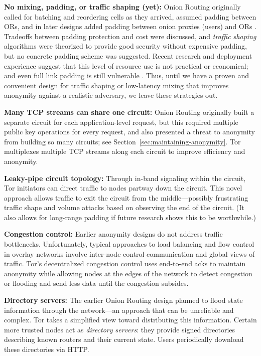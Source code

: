 \documentclass[times,10pt,twocolumn]{article}
\begin{document}
\textbf{No mixing, padding, or traffic shaping (yet):} Onion
Routing originally called for batching and reordering cells as they arrived,
assumed padding between ORs, and in
later designs added padding between onion proxies (users) and ORs
\cite{or-ih96,or-jsac98}.  Tradeoffs between padding protection
and cost were discussed, and \emph{traffic shaping} algorithms were
theorized \cite{or-pet00} to provide good security without expensive
padding, but no concrete padding scheme was suggested.
Recent research \cite{econymics}
and deployment experience \cite{freedom21-security} suggest that this
level of resource use is not practical or economical; and even full
link padding is still vulnerable \cite{defensive-dropping}. Thus,
until we have a proven and convenient design for traffic shaping or
low-latency mixing that improves anonymity against a realistic
adversary, we leave these strategies out.

\textbf{Many TCP streams can share one circuit:} Onion Routing originally
built a separate circuit for each
application-level request, but this required
multiple public key operations for every request, and also presented
a threat to anonymity from building so many circuits; see
Section~\ref{sec:maintaining-anonymity}.  Tor multiplexes multiple TCP
streams along each circuit to improve efficiency and anonymity.

\textbf{Leaky-pipe circuit topology:} Through in-band signaling
within the circuit, Tor initiators can direct traffic to nodes partway
down the circuit. This novel approach
allows traffic to exit the circuit from the middle---possibly
frustrating traffic shape and volume attacks based on observing the end
of the circuit. (It also allows for long-range padding if
future research shows this to be worthwhile.)

\textbf{Congestion control:} Earlier anonymity designs do not
address traffic bottlenecks. Unfortunately, typical approaches to
load balancing and flow control in overlay networks involve inter-node
control communication and global views of traffic. Tor's decentralized
congestion control uses end-to-end acks to maintain anonymity
while allowing nodes at the edges of the network to detect congestion
or flooding and send less data until the congestion subsides.

\textbf{Directory servers:} The earlier Onion Routing design
planned to flood state information through the network---an approach
that can be unreliable and complex. %
Tor takes a simplified view toward distributing this
information. Certain more trusted nodes act as \emph{directory
servers}: they provide signed directories describing known
routers and their current state. Users periodically download these
directories via HTTP.
\end{document}
